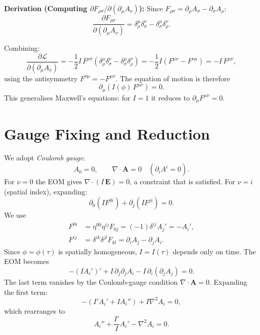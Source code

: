 \documentclass[12pt,a4paper,openany]{book}
\begin{document}
\medskip
\noindent\textbf{Derivation (Computing $\partial F_{\rho\sigma}/\partial(\partial_\mu A_\nu)$):} Since $F_{\rho\sigma} = \partial_\rho A_\sigma - \partial_\sigma A_\rho$:
\begin{equation}
  \frac{\partial F_{\rho\sigma}}{\partial(\partial_\mu A_\nu)} = \delta^\mu_\rho\delta^\nu_\sigma - \delta^\mu_\sigma\delta^\nu_\rho.
\end{equation}

Combining:
\begin{equation}
  \frac{\partial\mathcal{L}}{\partial(\partial_\mu A_\nu)}
    = -\frac{1}{2}I\,F^{\rho\sigma}\left(\delta^\mu_\rho\delta^\nu_\sigma - \delta^\mu_\sigma\delta^\nu_\rho\right)
    = -\frac{1}{2}I\left(F^{\mu\nu} - F^{\nu\mu}\right) = -I\,F^{\mu\nu},
\end{equation}
using the antisymmetry $F^{\nu\mu} = -F^{\mu\nu}$. The equation of motion is therefore
\begin{equation}
  \boxed{\partial_\mu\!\left(I(\phi)\,F^{\mu\nu}\right) = 0.}
\end{equation}
This generalises Maxwell's equations: for $I=1$ it reduces to $\partial_\mu F^{\mu\nu}=0$.

\section{Gauge Fixing and Reduction}

We adopt \emph{Coulomb gauge}:
\begin{equation}
  A_0 = 0, \qquad \nabla\cdot\mathbf{A} = 0 \quad (\partial_i A^i = 0).
\end{equation}
For $\nu = 0$ the EOM gives $\nabla\cdot(I\,\mathbf{E}) = 0$, a constraint that is satisfied. For $\nu = i$ (spatial index), expanding:
\begin{equation}
  \partial_0\!\left(I F^{0i}\right) + \partial_j\!\left(I F^{ji}\right) = 0.
\end{equation}
We use
\begin{align}
  F^{0i} &= \eta^{00}\eta^{ij}F_{0j} = (-1)\delta^{ij}A_j' = -A_i', \\
  F^{ij} &= \delta^{ik}\delta^{jl}F_{kl} = \partial_i A_j - \partial_j A_i.
\end{align}
Since $\phi = \phi(\tau)$ is spatially homogeneous, $I = I(\tau)$ depends only on time. The EOM becomes
\begin{equation}
  -(I A_i')' + I\,\partial_j\partial_j A_i - I\,\partial_i(\partial_j A_j) = 0.
\end{equation}
The last term vanishes by the Coulomb-gauge condition $\nabla\cdot\mathbf{A}=0$. Expanding the first term:
\begin{equation}
  -(I'A_i' + I A_i'') + I\nabla^2 A_i = 0,
\end{equation}
which rearranges to
\begin{equation}
  \boxed{A_i'' + \frac{I'}{I}A_i' - \nabla^2 A_i = 0.}
  \label{eq:Aeom}
\end{equation}
\end{document}
